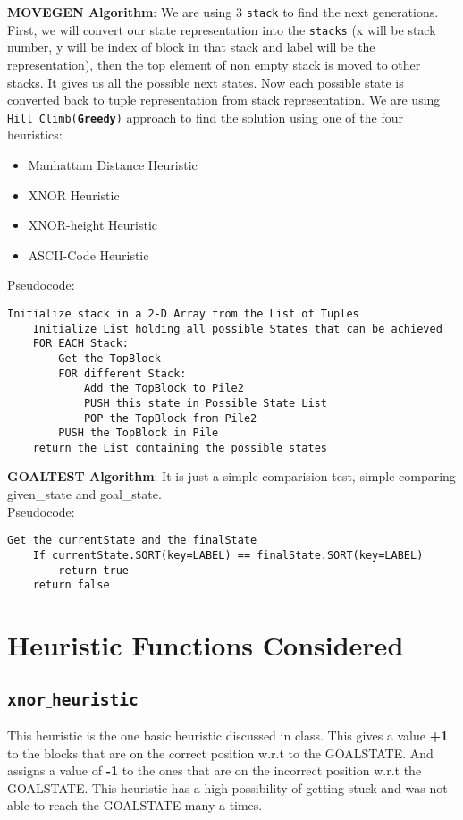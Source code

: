 \documentclass[a4paper,10pt,reqno,oneside]{amsart}
\begin{document}
\textbf{MOVEGEN Algorithm}: We are using 3 \texttt{stack} to find the next generations. First, we will convert 
our state representation into the \texttt{stacks} (x will be stack number, y  will be index of block in that stack and label will 
be the representation), then the top element of non empty stack is moved to other stacks. It gives us all the possible next states. 
Now each possible state is converted back to tuple representation from stack representation. We are using 
\texttt{Hill Climb(\textbf{Greedy})} approach to find the solution using one of the four heuristics:
\begin{itemize}
    \item Manhattam Distance Heuristic
    \item XNOR Heuristic
    \item XNOR-height Heuristic
    \item ASCII-Code Heuristic
\end{itemize}
Pseudocode:
\begin{lstlisting}[frame=single]
    Initialize stack in a 2-D Array from the List of Tuples 
    Initialize List holding all possible States that can be achieved
    FOR EACH Stack:
        Get the TopBlock
        FOR different Stack:
            Add the TopBlock to Pile2
            PUSH this state in Possible State List
            POP the TopBlock from Pile2
        PUSH the TopBlock in Pile
    return the List containing the possible states
\end{lstlisting}

\textbf{GOALTEST Algorithm}: It is just a simple comparision test, simple 
comparing given\_state and goal\_state.\\
Pseudocode:
\begin{lstlisting}[frame=single]
    Get the currentState and the finalState
    If currentState.SORT(key=LABEL) == finalState.SORT(key=LABEL)
        return true
    return false
\end{lstlisting}
\section{Heuristic Functions Considered}
\subsection*{\texttt{xnor$\_$heuristic}}
This heuristic is the one basic heuristic discussed in class. This gives a value \textbf{+1}
to the blocks that are on the correct position w.r.t to the GOALSTATE. And assigns a value of 
\textbf{-1} to the ones that are on the incorrect position w.r.t the GOALSTATE.
\newline
This heuristic has a high possibility of getting stuck and was not able to reach the GOALSTATE many a times.
\end{document}
